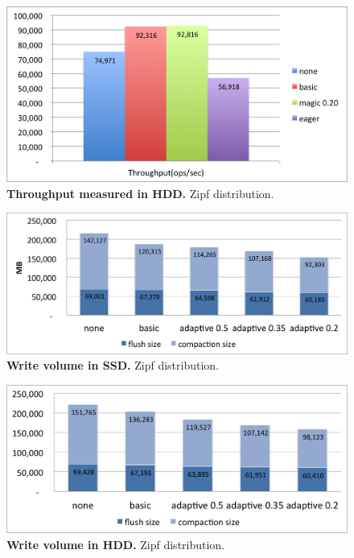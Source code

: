 {\begin{figure}[htb]
\includegraphics[width=\figw]{Figs/throughput-hdd.png}
\caption{{\bf  Throughput measured in HDD.} Zipf distribution. 
}
\label{fig:throughput-hdd}
\end{figure}




\begin{figure}[htb]
\includegraphics[width=\figw]{Figs/volume-ssd.png}
\caption{{\bf  Write volume in SSD.} Zipf distribution.
}
\label{fig:volume-ssd}
\end{figure}

\begin{figure}[htb]
\includegraphics[width=\figw]{Figs/volume-hdd.png}
\caption{{\bf  Write volume in HDD.} Zipf distribution.
}
\label{fig:volume-hdd}
\end{figure}

}

